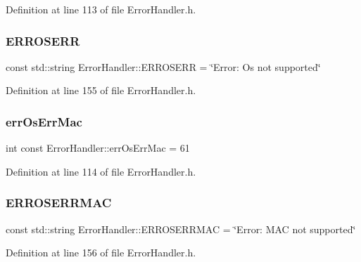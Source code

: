 Definition at line 113 of file Error\+Handler.\+h.

\mbox{\label{classErrorHandler_addc0430f69f200c95ae36b23cd0d10a6}} 
\subsubsection{\texorpdfstring{ERROSERR}{ERROSERR}}
{\footnotesize\ttfamily const std\+::string Error\+Handler\+::\+E\+R\+R\+O\+S\+E\+RR = \char`\"{}Error\+: Os not supported\char`\"{}\hspace{0.3cm}{\ttfamily [static]}}



Definition at line 155 of file Error\+Handler.\+h.

\mbox{\label{classErrorHandler_a8a55f0e95e22d240e37739a851d2fe8d}} 
\subsubsection{\texorpdfstring{errOsErrMac}{errOsErrMac}}
{\footnotesize\ttfamily int const Error\+Handler\+::err\+Os\+Err\+Mac = 61\hspace{0.3cm}{\ttfamily [static]}}



Definition at line 114 of file Error\+Handler.\+h.

\mbox{\label{classErrorHandler_a05fc7c7e84ed87c3d91eeb5336a042e3}} 
\subsubsection{\texorpdfstring{ERROSERRMAC}{ERROSERRMAC}}
{\footnotesize\ttfamily const std\+::string Error\+Handler\+::\+E\+R\+R\+O\+S\+E\+R\+R\+M\+AC = \char`\"{}Error\+: M\+AC not supported\char`\"{}\hspace{0.3cm}{\ttfamily [static]}}



Definition at line 156 of file Error\+Handler.\+h.

